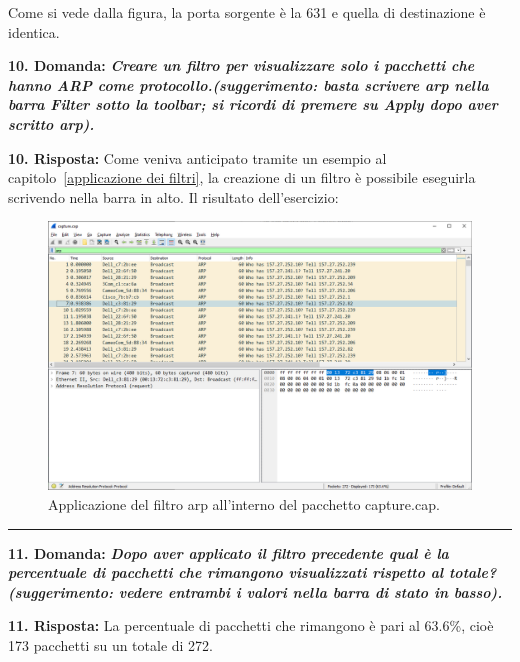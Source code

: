 \documentclass[a4paper]{article}
\newcommand{\longline}{\noindent\rule{\textwidth}{0.4pt}}
\begin{document}
	\noindent
	Come si vede dalla figura, la porta sorgente è la 631 e quella di destinazione è identica.\newpage
	
	\noindent
	\textcolor{Red3}{\textbf{10. Domanda:}} \textbf{\emph{Creare un filtro per visualizzare solo i pacchetti che hanno ARP come protocollo.\newline (\emph{suggerimento}: basta scrivere \textsf{arp} nella barra \textsf{Filter} sotto la toolbar; si ricordi di premere su \textsf{Apply} dopo aver scritto \textsf{arp}).}}\newline
	
	
	\noindent
	\textcolor{Green4}{\textbf{10. Risposta:}} Come veniva anticipato tramite un esempio al capitolo~\ref{applicazione dei filtri}, la creazione di un filtro è possibile eseguirla scrivendo nella barra in alto. Il risultato dell'esercizio:
	\begin{figure}[!htp]
		\centering
		\includegraphics[width=\textwidth]{img/wireshark/ex1-5.png}
		\caption{Applicazione del filtro \textsf{arp} all'interno del pacchetto \textsf{capture.cap}.}
	\end{figure}
	
	\longline\newline
	
	\noindent
	\textcolor{Red3}{\textbf{11. Domanda:}} \textbf{\emph{Dopo aver applicato il filtro precedente qual è la percentuale di pacchetti che rimangono visualizzati rispetto al totale?\newline
			(\emph{suggerimento}: vedere entrambi i valori nella barra di stato in basso).}}\newline
	
	
	\noindent
	\textcolor{Green4}{\textbf{11. Risposta:}} La percentuale di pacchetti che rimangono è pari al 63.6\%, cioè 173 pacchetti su un totale di 272.\newpage
	
\end{document}
